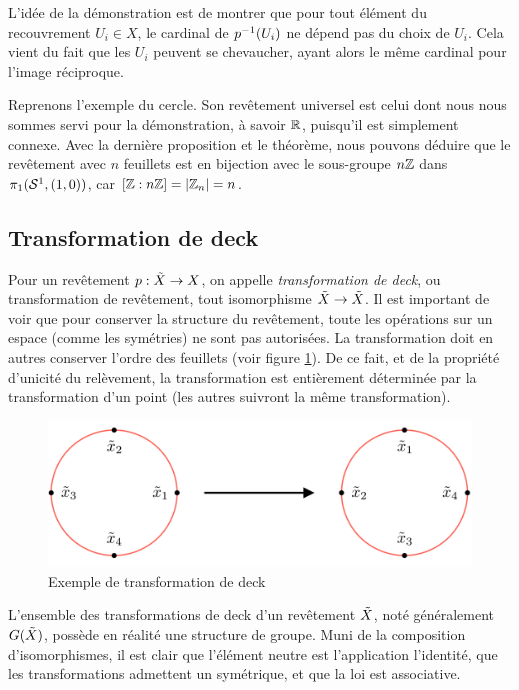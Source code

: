 L'idée de la démonstration est de montrer que pour tout élément du recouvrement $U_i\in X$, le cardinal de $p^{-1} (U_i)$ ne dépend pas du choix de $U_i$. Cela vient du fait que les $U_i$ peuvent se chevaucher, ayant alors le même cardinal pour l'image réciproque.

\begin{exemple}
Reprenons l'exemple du cercle. Son revêtement universel est celui dont nous nous sommes servi pour la démonstration, à savoir $\mathbb{R}$, puisqu'il est simplement connexe. Avec la dernière proposition et le théorème, nous pouvons déduire que le revêtement avec $n$ feuillets est en bijection avec le sous-groupe $n\mathbb{Z}$ dans $\pi_1(\mathcal{S}^{1},(1,0))$, car $[\mathbb{Z}:n\mathbb{Z}]=|\mathbb{Z}_n|=n$.
\end{exemple}

\subsection{Transformation de deck}

Pour un revêtement $p:\Tilde{X}\to X$, on appelle \emph{transformation de deck}, ou transformation de revêtement, tout isomorphisme $\Tilde{X}\to\Tilde{X}$. Il est important de voir que pour conserver la structure du revêtement, toute les opérations sur un espace (comme les symétries) ne sont pas autorisées. La transformation doit en autres conserver l'ordre des feuillets (voir figure \ref{fig:deck-transformation}). De ce fait, et de la propriété d'unicité du relèvement, la transformation est entièrement déterminée par la transformation d'un point (les autres suivront la même transformation).

\begin{figure}[H]
    \centering
    \includegraphics[width=0.5\linewidth]{pictures/CoverCircle2_2_ManimCE_v0.18.1.png}
    \caption{Exemple de transformation de deck}
    \label{fig:deck-transformation}
\end{figure}

L'ensemble des transformations de deck d'un revêtement $\Tilde{X}$, noté généralement $G(\Tilde{X})$, possède en réalité une structure de groupe. Muni de la composition d'isomorphismes, il est clair que l'élément neutre est l'application l'identité, que les transformations admettent un symétrique, et que la loi est associative. 

